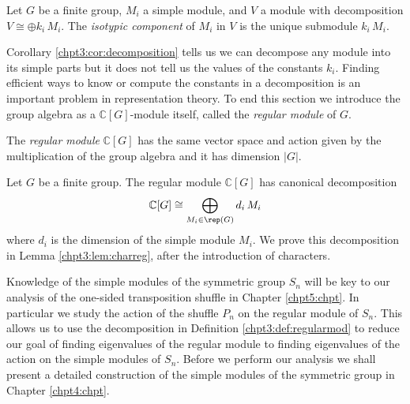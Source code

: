 \documentclass[11pt]{report}
\begin{document}
\begin{defn}
	\label{chpt3:def:isocompotent}
	Let $G$ be a finite group, $M_{i}$ a simple module, and $V$ a module with decomposition $V \cong \oplus k_{i}	\, M_{i}$. The \emph{isotypic component} of $M_{i}$ in $V$ is the unique submodule $k_{i} \, M_{i}$.
\end{defn}

Corollary 
\ref{chpt3:cor:decomposition} tells us we can 
decompose any module into its 
simple parts but it does not tell us the values of the constants $k_{i}$. 
Finding efficient ways to know or compute the constants in a decomposition is an important problem in representation theory. To end this section we introduce  the group algebra as a $\mathbb{C}[G]$-module itself, called the \emph{regular module} of $G$.

\begin{defn}
	\label{chpt3:def:regularmod}
	The \emph{regular module} $\mathbb{C}[G]$ has the same vector space and action given by the multiplication of the 
	group algebra and it has dimension $|G|$.
	
\end{defn}

\begin{lemma}
	Let $G$ be a finite group.
	The regular module $\mathbb{C}[G]$ has canonical 
	decomposition
	\begin{eqnarray}
	\mathbb{C}[G] \cong \bigoplus_{M_{i} \in \rep(G)} d_{i} \, M_{i} 
	\end{eqnarray} 
	where $d_{i}$ is the dimension of the simple module $M_{i}$. We prove this decomposition in Lemma \ref{chpt3:lem:charreg}, after the introduction of characters.
\end{lemma}

Knowledge of the simple 
modules of the symmetric group $S_{n}$ will be key to our analysis of the one-sided transposition 
shuffle in Chapter \ref{chpt5:chpt}. 
In particular we study the action of the shuffle $P_{n}$  
on the regular module of $S_{n}$.
This allows us to use the decomposition in Definition \ref{chpt3:def:regularmod} to reduce our goal of finding eigenvalues of the regular module to finding 
eigenvalues of the action on the simple modules of $S_{n}$. Before we perform our analysis we shall present a detailed construction of the simple modules of the symmetric group in Chapter \ref{chpt4:chpt}.
\end{document}
